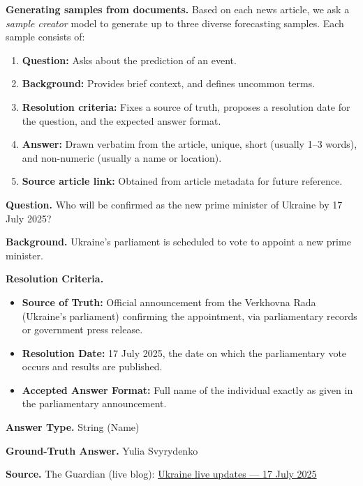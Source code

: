 \textbf{Generating samples from documents.} Based on each news article, we ask a \textit{sample creator} model to generate up to three diverse forecasting samples. Each sample consists of: 
\begin{enumerate}
    \item \textbf{Question:} Asks about the prediction of an event. %
    \item \textbf{Background:} Provides brief context, and defines uncommon terms.
    \item \textbf{Resolution criteria:} Fixes a source of truth, proposes a resolution date for the question, and the expected answer format.
    \item \textbf{Answer:} Drawn verbatim from the article, unique, short (usually 1–3 words), and non-numeric (usually a name or location).
    \item \textbf{Source article link:} Obtained from article metadata for future reference.
\end{enumerate} \vspace{0.15cm}

\begin{tcolorbox}[title=\textbf{Sample Generated Forecasting Question}, colframe=black!70, colback=black!2, boxrule=0.5pt, breakable]
\textbf{Question.} Who will be confirmed as the new prime minister of Ukraine by 17 July 2025?

\medskip
\textbf{Background.}
Ukraine's parliament is scheduled to vote to appoint a new prime minister.

\medskip
\textbf{Resolution Criteria.}
\begin{itemize}[leftmargin=1.1em, itemsep=0.2em]
  \item \textbf{Source of Truth:} Official announcement from the Verkhovna Rada (Ukraine's parliament) confirming the appointment, via parliamentary records or government press release.
  \item \textbf{Resolution Date:} 17 July 2025, the date on which the parliamentary vote occurs and results are published.
  \item \textbf{Accepted Answer Format:} Full name of the individual exactly as given in the parliamentary announcement.
\end{itemize}

\medskip
\textbf{Answer Type.} String (Name)

\medskip
\textbf{Ground-Truth Answer.} Yulia Svyrydenko

\medskip
\textbf{Source.} The Guardian (live blog): \href{https://www.theguardian.com/world/live/2025/jul/17/ukraine-russia-war-patriot-nato-latest-europe-news-live-updates}{Ukraine live updates --- 17 July 2025}
\end{tcolorbox} \vspace{0.15cm}

